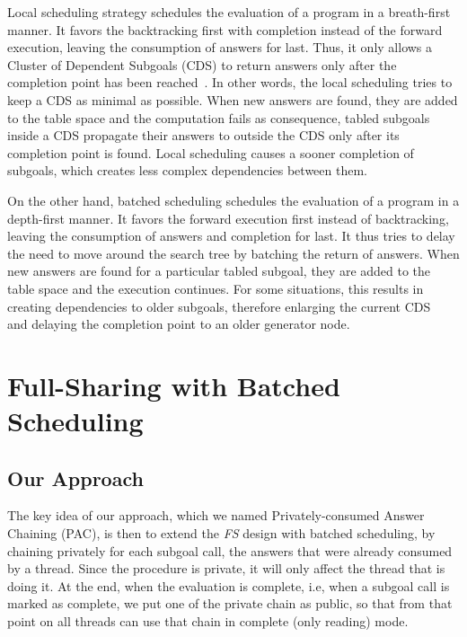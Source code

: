 \documentclass{llncs}
\begin{document}
Local scheduling strategy schedules the evaluation of a program in a
breath-first manner. It favors the backtracking first with completion
instead of the forward execution, leaving the consumption of answers
for last. Thus, it only allows a Cluster of Dependent Subgoals (CDS)
to return answers only after the completion point has been
reached~\cite{Freire-96}. In other words, the local scheduling tries
to keep a CDS as minimal as possible. When new answers are found, they
are added to the table space and the computation fails as consequence,
tabled subgoals inside a CDS propagate their answers to outside the
CDS only after its completion point is found. Local scheduling causes
a sooner completion of subgoals, which creates less complex
dependencies between them.

On the other hand, batched scheduling schedules the evaluation of a
program in a depth-first manner. It favors the forward execution first
instead of backtracking, leaving the consumption of answers and
completion for last. It thus tries to delay the need to move around
the search tree by batching the return of answers. When new answers
are found for a particular tabled subgoal, they are added to the table
space and the execution continues. For some situations, this results
in creating dependencies to older subgoals, therefore enlarging the
current CDS~\cite{Sagonas-98} and delaying the completion point to an
older generator node.

\section{Full-Sharing with Batched Scheduling}

\subsection{Our Approach}

The key idea of our approach, which we named Privately-consumed Answer
Chaining (PAC), is then to extend the \emph{FS} design with batched
scheduling, by chaining privately for each subgoal call, the answers
that were already consumed by a thread. Since the procedure is
private, it will only affect the thread that is doing it. At the end,
when the evaluation is complete, i.e, when a subgoal call is marked as
complete, we put one of the private chain as public, so that from that
point on all threads can use that chain in complete (only reading)
mode.
\end{document}
